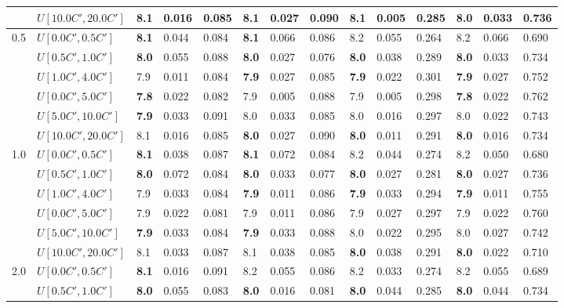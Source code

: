 \begin{table}[h]
{\begin{tabular}{|l|l||l|l|l||l|l|l||l|l|l||l|l|l|}
       & $U[10.0C',20.0C']$ & 8.1 & 0.016 & 0.085 & 8.1 & 0.027 & 0.090 & 8.1 & 0.005 & 0.285 & \textbf{8.0} & 0.033 & 0.736 \\
      \hline\hline
      \multirow{6}{*}{0.5} & $U[0.0C',0.5C']$ & \textbf{8.1} & 0.044 & 0.084 & \textbf{8.1} & 0.066 & 0.086 & 8.2 & 0.055 & 0.264 & 8.2 & 0.066 & 0.690 \\
       & $U[0.5C',1.0C']$ & \textbf{8.0} & 0.055 & 0.088 & \textbf{8.0} & 0.027 & 0.076 & \textbf{8.0} & 0.038 & 0.289 & \textbf{8.0} & 0.033 & 0.734 \\
       & $U[1.0C',4.0C']$ & 7.9 & 0.011 & 0.084 & \textbf{7.9} & 0.027 & 0.085 & \textbf{7.9} & 0.022 & 0.301 & \textbf{7.9} & 0.027 & 0.752 \\
       & $U[0.0C',5.0C']$ & \textbf{7.8} & 0.022 & 0.082 & 7.9 & 0.005 & 0.088 & 7.9 & 0.005 & 0.298 & \textbf{7.8} & 0.022 & 0.762 \\
       & $U[5.0C',10.0C']$ & \textbf{7.9} & 0.033 & 0.091 & 8.0 & 0.033 & 0.085 & 8.0 & 0.016 & 0.297 & 8.0 & 0.022 & 0.743 \\
       & $U[10.0C',20.0C']$ & 8.1 & 0.016 & 0.085 & \textbf{8.0} & 0.027 & 0.090 & \textbf{8.0} & 0.011 & 0.291 & \textbf{8.0} & 0.016 & 0.734 \\
      \hline\hline
      \multirow{6}{*}{1.0} & $U[0.0C',0.5C']$ & \textbf{8.1} & 0.038 & 0.087 & \textbf{8.1} & 0.072 & 0.084 & 8.2 & 0.044 & 0.274 & 8.2 & 0.050 & 0.680 \\
       & $U[0.5C',1.0C']$ & \textbf{8.0} & 0.072 & 0.084 & \textbf{8.0} & 0.033 & 0.077 & \textbf{8.0} & 0.027 & 0.281 & \textbf{8.0} & 0.027 & 0.736 \\
       & $U[1.0C',4.0C']$ & 7.9 & 0.033 & 0.084 & \textbf{7.9} & 0.011 & 0.086 & \textbf{7.9} & 0.033 & 0.294 & \textbf{7.9} & 0.011 & 0.755 \\
       & $U[0.0C',5.0C']$ & 7.9 & 0.022 & 0.081 & 7.9 & 0.011 & 0.086 & 7.9 & 0.027 & 0.297 & 7.9 & 0.022 & 0.760 \\
       & $U[5.0C',10.0C']$ & \textbf{7.9} & 0.033 & 0.084 & \textbf{7.9} & 0.033 & 0.088 & 8.0 & 0.022 & 0.295 & 8.0 & 0.027 & 0.742 \\
       & $U[10.0C',20.0C']$ & 8.1 & 0.033 & 0.087 & 8.1 & 0.038 & 0.085 & \textbf{8.0} & 0.038 & 0.291 & \textbf{8.0} & 0.022 & 0.710 \\
      \hline\hline
      \multirow{6}{*}{2.0} & $U[0.0C',0.5C']$ & \textbf{8.1} & 0.016 & 0.091 & 8.2 & 0.055 & 0.086 & 8.2 & 0.033 & 0.274 & 8.2 & 0.055 & 0.689 \\
       & $U[0.5C',1.0C']$ & \textbf{8.0} & 0.055 & 0.083 & \textbf{8.0} & 0.016 & 0.081 & \textbf{8.0} & 0.044 & 0.285 & \textbf{8.0} & 0.044 & 0.734 \\

\end{tabular}}
\end{table}
